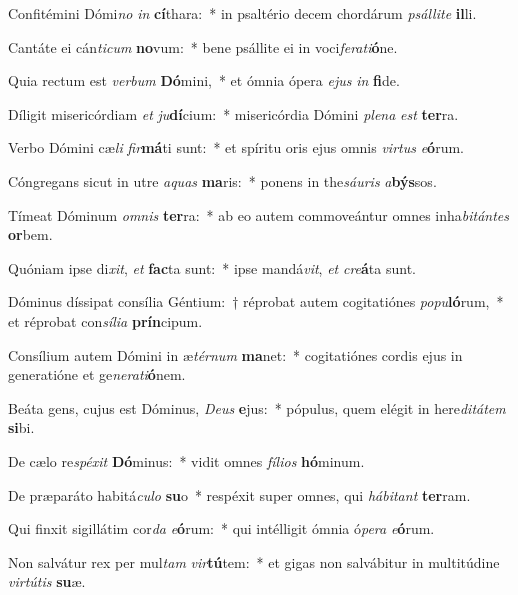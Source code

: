 \item Confitémini Dómi\textit{no} \textit{in} \textbf{cí}thara:~* in psaltério decem chordárum \textit{psál}\textit{li}\textit{te} \textbf{il}li.
\item Cantáte ei cán\textit{ti}\textit{cum} \textbf{no}vum:~* bene psállite ei in voci\textit{fe}\textit{ra}\textit{ti}\textbf{ó}ne.
\item Quia rectum est \textit{ver}\textit{bum} \textbf{Dó}mini,~* et ómnia ópera \textit{e}\textit{jus} \textit{in} \textbf{fi}de.
\item Díligit misericórdiam \textit{et} \textit{ju}\textbf{dí}cium:~* misericórdia Dómini \textit{ple}\textit{na} \textit{est} \textbf{ter}ra.
\item Verbo Dómini cæ\textit{li} \textit{fir}\textbf{má}ti sunt:~* et spíritu oris ejus omnis \textit{vir}\textit{tus} \textit{e}\textbf{ó}rum.
\item Cóngregans sicut in utre \textit{a}\textit{quas} \textbf{ma}ris:~* ponens in the\textit{sáu}\textit{ris} \textit{a}\textbf{býs}sos.
\item Tímeat Dóminum \textit{om}\textit{nis} \textbf{ter}ra:~* ab eo autem commoveántur omnes inha\textit{bi}\textit{tán}\textit{tes} \textbf{or}bem.
\item Quóniam ipse di\textit{xit}, \textit{et} \textbf{fac}ta sunt:~* ipse mandá\textit{vit}, \textit{et} \textit{cre}\textbf{á}ta sunt.
\item Dóminus díssipat consília Géntium:~† réprobat autem cogitatiónes \textit{po}\textit{pu}\textbf{ló}rum,~* et réprobat con\textit{sí}\textit{li}\textit{a} \textbf{prín}cipum.
\item Consílium autem Dómini in æ\textit{tér}\textit{num} \textbf{ma}net:~* cogitatiónes cordis ejus in generatióne et ge\textit{ne}\textit{ra}\textit{ti}\textbf{ó}nem.
\item Beáta gens, cujus est Dóminus, \textit{De}\textit{us} \textbf{e}jus:~* pópulus, quem elégit in here\textit{di}\textit{tá}\textit{tem} \textbf{si}bi.
\item De cælo re\textit{spé}\textit{xit} \textbf{Dó}minus:~* vidit omnes \textit{fí}\textit{li}\textit{os} \textbf{hó}minum.
\item De præparáto habitá\textit{cu}\textit{lo} \textbf{su}o~* respéxit super omnes, qui \textit{há}\textit{bi}\textit{tant} \textbf{ter}ram.
\item Qui finxit sigillátim cor\textit{da} \textit{e}\textbf{ó}rum:~* qui intélligit ómnia ó\textit{pe}\textit{ra} \textit{e}\textbf{ó}rum.
\item Non salvátur rex per mul\textit{tam} \textit{vir}\textbf{tú}tem:~* et gigas non salvábitur in multitúdine \textit{vir}\textit{tú}\textit{tis} \textbf{su}æ.
